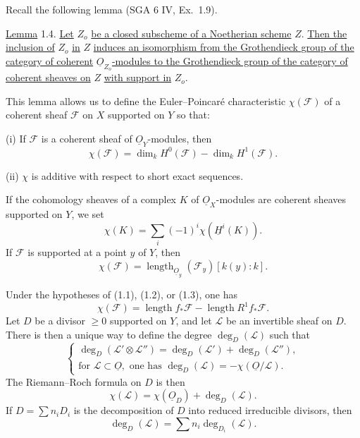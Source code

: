 Recall the following lemma (SGA 6 IV, Ex.~1.9).

\underline{Lemma} 1.4. \underline{Let} $Z_o$ \underline{be a closed subscheme of a
Noetherian scheme} $Z$. \underline{Then the inclusion of} $Z_o$ \underline{in} $Z$
\underline{induces an isomorphism from the Grothendieck group of the category of
coherent} $\underline{O}_{Z_o}$\underline{-modules to the Grothendieck group of the
category of coherent sheaves on} $Z$ \underline{with support in} $Z_o$.

This lemma allows us to define the Euler--Poincaré characteristic $\chi(\mathcal F)$
of a coherent sheaf $\mathcal F$ on $X$ supported on $Y$ so that:

(i) If $\mathcal F$ is a coherent sheaf of $\underline{O}_Y$-modules, then
\begin{equation}\tag{1.4.1}
\chi(\mathcal F)=\dim_k H^0(\mathcal F)-\dim_k H^1(\mathcal F).
\end{equation}

(ii) $\chi$ is additive with respect to short exact sequences.

If the cohomology sheaves of a complex $K$ of $\underline{O}_X$-modules are coherent
sheaves supported on $Y$, we set
\begin{equation}\tag{1.4.2}
\chi(K)=\sum_i(-1)^i\chi(\underline{H}^i(K)).
\end{equation}
If $\mathcal F$ is supported at a point $y$ of $Y$, then
\begin{equation}\tag{1.4.3}
\chi(\mathcal F)=\operatorname{length}_{\underline{O}_y}(\mathcal F_y)[k(y):k].
\end{equation}


Under the hypotheses of (1.1), (1.2), or (1.3), one has
\begin{equation}\tag{1.4.4}
\chi(\mathcal F)=\operatorname{length}f_*\mathcal F-
\operatorname{length}R^1f_*\mathcal F.
\end{equation}
Let $D$ be a divisor $\geq0$ supported on $Y$, and let $\mathcal L$ be an invertible
sheaf on $D$.  There is then a unique way to define the degree
$\deg_D(\mathcal L)$ such that
\begin{equation}\tag{1.4.5}
\left\{
\begin{array}{l}
\deg_D(\mathcal L'\otimes\mathcal L'')=
\deg_D(\mathcal L')+\deg_D(\mathcal L''),\\[3ex]
\text{for }\mathcal L\subset\underline O,
\text{ one has }\deg_D(\mathcal L)=-\chi(\underline O/\mathcal L).
\end{array}
\right.
\end{equation}
The Riemann--Roch formula on $D$ is then
\begin{equation}\tag{1.4.6}
\chi(\mathcal L)=\chi(\underline{O}_D)+\deg_D(\mathcal L).
\end{equation}
If $D=\sum n_iD_i$ is the decomposition of $D$ into reduced irreducible divisors,
then
\begin{equation}\tag{1.4.7}
\deg_D(\mathcal L)=\sum n_i\deg_{D_i}(\mathcal L).
\end{equation}

